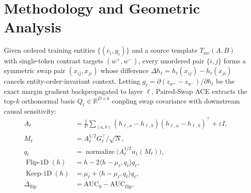 \documentclass[10pt,twocolumn]{article}
\begin{document}
\section{Methodology and Geometric Analysis}
Given ordered training entities $\{(e_i, y_i)\}$ and a source template $T_{\mathrm{src}}(A,B)$ with single-token contrast targets $(w^+, w^-)$, every unordered pair $\{i,j\}$ forms a symmetric swap pair $(x_{ij}, x_{ji})$ whose difference $\Delta h_\ell = h_\ell(x_{ij}) - h_\ell(x_{ji})$ cancels entity-order-invariant context. Letting $g_\ell = \partial(z_{w^+} - z_{w^-})/\partial h_\ell$ be the exact margin gradient backpropagated to layer $\ell$, Paired-Swap ACE extracts the top-$k$ orthonormal basis $Q_\ell \in \mathbb{R}^{D\times k}$ coupling swap covariance with downstream causal sensitivity:
\begin{align}
  A_\ell &= \tfrac{1}{P}\sum_{(a,b)} (h_{\ell,a} - h_{\ell,b})(h_{\ell,a} - h_{\ell,b})^\top + \varepsilon I, \nonumber \\
  M_\ell &= A_\ell^{1/2} G_\ell^\top / \sqrt{N}, \nonumber \\
  q_\ell &= \operatorname{normalize}\!\big(A_\ell^{1/2} u_1(M_\ell)\big), \label{eq:ace_cov} \\
  \operatorname{Flip\text{-}1D}(h) &= h - 2\langle h - \mu_\ell, q_\ell\rangle q_\ell, \label{eq:ace_flip} \\
  \operatorname{Keep\text{-}1D}(h) &= \mu_\ell + \langle h - \mu_\ell, q_\ell\rangle q_\ell, \nonumber \\
  \Delta_{\mathrm{flip}} &= \mathrm{AUC}_0 - \mathrm{AUC}_{\mathrm{flip}}. \label{eq:ace_keep}
\end{align}
\end{document}
